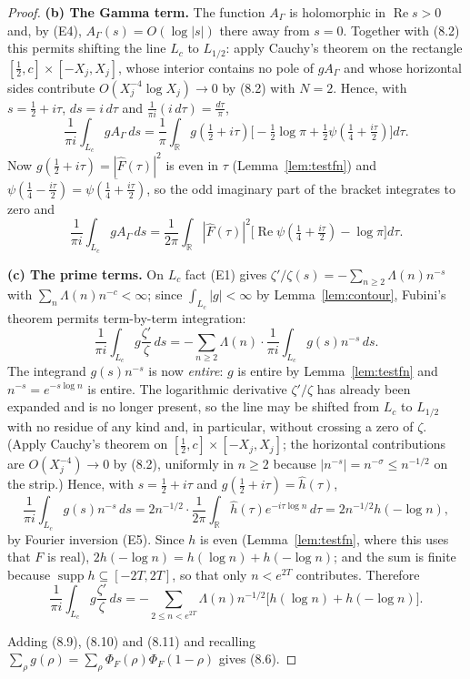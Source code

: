 \documentclass[11pt]{amsart}
\theoremstyle{definition}
\theoremstyle{remark}
\newcommand{\R}{\mathbb R}
\newcommand{\Rel}{\operatorname{Re}}
\newcommand{\supp}{\operatorname{supp}}
\begin{document}
\begin{proof}
\medskip
\noindent\textbf{(b) The Gamma term.}  The function $A_\Gamma$ is holomorphic
in $\Rel s>0$ and, by (E4), $A_\Gamma(s)=O(\log|s|)$ there away from $s=0$.
Together with (8.2) this permits shifting the line $L_c$ to $L_{1/2}$: apply
Cauchy's theorem on the rectangle $[\tfrac12,c]\times[-X_j,X_j]$, whose
interior contains no pole of $gA_\Gamma$ and whose horizontal sides contribute
$O(X_j^{-4}\log X_j)\to0$ by (8.2) with $N=2$.  Hence, with $s=\tfrac12+i\tau$,
$ds=i\,d\tau$ and $\frac1{\pi i}(i\,d\tau)=\frac{d\tau}\pi$,
\[
  \frac1{\pi i}\int_{L_c}gA_\Gamma\,ds
  =\frac1{\pi}\int_\R g(\tfrac12+i\tau)
     \bigl[-\tfrac12\log\pi+\tfrac12\psi(\tfrac14+\tfrac{i\tau}2)\bigr]d\tau .
\]
Now $g(\tfrac12+i\tau)=|\hat F(\tau)|^2$ is even in $\tau$
(Lemma~\ref{lem:testfn}) and
$\psi(\tfrac14-\tfrac{i\tau}2)=\overline{\psi(\tfrac14+\tfrac{i\tau}2)}$, so
the odd imaginary part of the bracket integrates to zero and
\begin{equation}
  \frac1{\pi i}\int_{L_c}gA_\Gamma\,ds
  =\frac1{2\pi}\int_\R|\hat F(\tau)|^2
     \bigl[\Rel\psi(\tfrac14+\tfrac{i\tau}2)-\log\pi\bigr]d\tau .
\tag{8.10}
\end{equation}

\medskip
\noindent\textbf{(c) The prime terms.}  On $L_c$ fact (E1) gives
$\zeta'/\zeta(s)=-\sum_{n\ge2}\Lambda(n)n^{-s}$ with
$\sum_n\Lambda(n)n^{-c}<\infty$; since $\int_{L_c}|g|<\infty$ by
Lemma~\ref{lem:contour}, Fubini's theorem permits term-by-term integration:
\[
  \frac1{\pi i}\int_{L_c}g\frac{\zeta'}{\zeta}\,ds
  =-\sum_{n\ge2}\Lambda(n)\cdot\frac1{\pi i}\int_{L_c}g(s)n^{-s}\,ds .
\]
The integrand $g(s)n^{-s}$ is now \emph{entire}: $g$ is entire by
Lemma~\ref{lem:testfn} and $n^{-s}=e^{-s\log n}$ is entire.  The logarithmic
derivative $\zeta'/\zeta$ has already been expanded and is no longer present,
so the line may be shifted from $L_c$ to $L_{1/2}$ with no residue of any kind
and, in particular, without crossing a zero of $\zeta$.  (Apply Cauchy's
theorem on $[\tfrac12,c]\times[-X_j,X_j]$; the horizontal contributions are
$O(X_j^{-4})\to0$ by (8.2), uniformly in $n\ge2$ because
$|n^{-s}|=n^{-\sigma}\le n^{-1/2}$ on the strip.)  Hence, with
$s=\tfrac12+i\tau$ and $g(\tfrac12+i\tau)=\hat h(\tau)$,
\[
  \frac1{\pi i}\int_{L_c}g(s)n^{-s}\,ds
  =2n^{-1/2}\cdot\frac1{2\pi}\int_\R\hat h(\tau)e^{-i\tau\log n}\,d\tau
  =2n^{-1/2}h(-\log n),
\]
by Fourier inversion (E5).  Since $h$ is even (Lemma~\ref{lem:testfn}, where
this uses that $F$ is real), $2h(-\log n)=h(\log n)+h(-\log n)$; and the sum is
finite because $\supp h\subseteq[-2T,2T]$, so that only $n<e^{2T}$ contributes.
Therefore
\begin{equation}
  \frac1{\pi i}\int_{L_c}g\frac{\zeta'}{\zeta}\,ds
  =-\sum_{2\le n<e^{2T}}\Lambda(n)n^{-1/2}\bigl[h(\log n)+h(-\log n)\bigr].
\tag{8.11}
\end{equation}

Adding (8.9), (8.10) and (8.11) and recalling
$\sum_\rho g(\rho)=\sum_\rho\Phi_F(\rho)\Phi_F(1-\rho)$ gives (8.6).
\end{proof}
\end{document}
